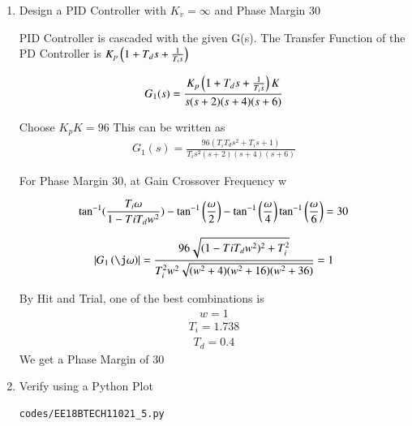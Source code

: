 \begin{enumerate}[label=\thesection.\arabic*.,ref=\thesection.\theenumi]
\item
Design a PID Controller with $K_{v} = \infty$ and Phase Margin 30\degree

\solution
PID Controller is cascaded with the given G(s).
The Transfer Function of the PD Controller is $K_{p}\left(1 + T_{d}s + \frac{1}{T_{i}s}\right)$

\begin{align}
    G_{1}(s) = \frac{K_{p}\left(1 + T_{d}s + \frac{1}{T_{i}s}\right)K}{s(s+2)(s+4)(s+6)}
\end{align}

Choose $K_{p}K = 96$
This can be written as
\begin{align}
    G_{1}(s) = \frac{96(T_{i}T_{d}s^2 + T_{i}s +  1)}{T_{i}s^2(s+2)(s+4)(s+6)}
\end{align}

For Phase Margin 30\degree, at Gain Crossover Frequency w

\begin{align}
    \tan^{-1}(\frac{T_{i}\omega}{1-T{i}T_{d}w^2}) - \tan^{-1}\left(\frac{\omega}{2}\right) - \tan^{-1}\left(\frac{\omega}{4}\right)
    \tan^{-1}\left(\frac{\omega}{6}\right) = 30
\end{align}

\begin{align}
    \abs{G_{1}\brak{\j\omega}} = \frac{96\sqrt{(1-T{i}T_{d}w^2)^2 + T_{i}^2}}{T_{i}^2w^2\sqrt{(w^2+4)(w^2 + 16)(w^2 + 36)}} = 1
\end{align}

By Hit and Trial, one of the best combinations is
\begin{align}
    w = 1
\end{align}
\begin{align}
    T_{i} = 1.738
\end{align}
\begin{align}
    T_{d} = 0.4
\end{align}
We get a Phase Margin of 30\degree

\item
Verify using a Python Plot

\solution
\begin{lstlisting}
codes/EE18BTECH11021_5.py
\end{lstlisting}


\end{enumerate}
